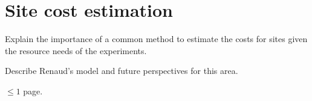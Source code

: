 \section{Site cost estimation}
Explain the importance of a common method to estimate the costs for sites
given the resource needs of the experiments.

Describe Renaud's model and future perspectives for this area.

$\leq 1$ page.
